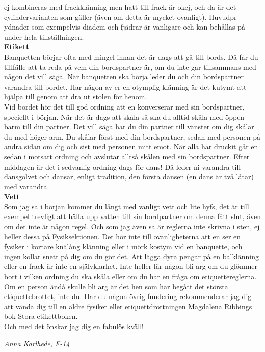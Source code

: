 \documentclass[a6paper,12pt]{article}
\begin{document}
ej kombineras med frackklänning men hatt till frack är okej, och då 
är det cylindervarianten som gäller (även om detta är mycket ovanligt). 
Huvudpr-\\
ydnader som exempelvis diadem och fjädrar är vanligare och kan 
behållas på under hela tillställningen.\\
\normalsize\textbf{Etikett}\\
\footnotesize Banquetten börjar ofta med mingel innan det är dags att gå 
till bords. Då får du tillfälle att ta reda på vem din bordspartner är, 
om du inte går tillsammans med någon det vill säga. När banquetten 
ska börja leder du och din bordspartner varandra till bordet. Har någon 
av er en otymplig klänning är det kutymt att hjälpa till genom att dra 
ut stolen för henom.\\
Vid bordet hör det till god ordning att en konverserar med sin bordspartner, 
speciellt i början. När det är dags att skåla så ska du alltid skåla med 
öppen barm
\newpage
\setlength{\oddsidemargin}{-0.57in}
\noindent
till din partner. Det vill säga har du din partner till vänster om dig 
skålar du med höger arm. Du skålar först med din bordspartner, sedan med 
personen på andra sidan om dig och sist med personen mitt emot. När alla 
har druckit går en sedan i motsatt ordning och avslutar alltså skålen 
med sin bordspartner. Efter middagen är det i sedvanlig ordning dags 
för dans! Då leder ni varandra till dansgolvet och dansar, enligt tradition, 
den första dansen (en dans är två låtar) med varandra.\\
\normalsize\textbf{Vett}\\
\footnotesize Som jag sa i början kommer du långt med vanligt vett och 
lite hyfs, det är till exempel trevligt att hälla upp vatten till sin 
bordpartner om denna fått slut, även om det inte är någon regel. Och som 
jag även sa är reglerna inte skrivna i sten, ej heller dessa på 
Fysiksektionen. Det hör inte till ovanligheterna att en ser en fysiker i 
kortare knälång klänning eller i mörk kostym vid en banquette, och ingen 
kollar snett på dig om du gör det. Att lägga dyra pengar på en balklänning 
eller en frack är inte en självklarhet. Inte heller lär någon bli arg om du 
glömmer bort i vilken ordning du ska skåla eller om du har en fråga om 
etiquettereglerna. Om en person ändå skulle bli arg är det hen som har begått 
det största etiquettebrottet, inte du. Har du någon övrig fundering 
rekommenderar jag dig att vända dig till en äldre fysiker eller 
etiquettdrottningen Magdalena Ribbings bok Stora etikettboken.\\
\indent Och med det önskar jag dig en fabulös kväll!
\begin{flushright}
\textit{Anna Karlhede, F-14}
\end{flushright}
\end{document}
